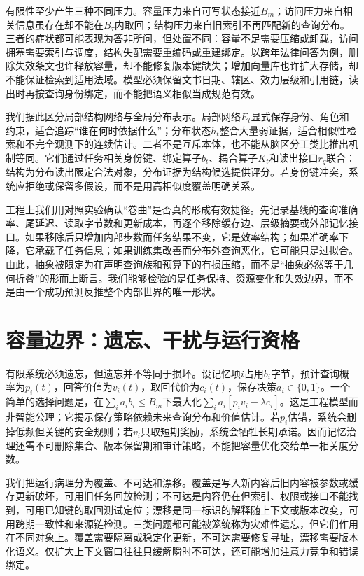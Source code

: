 有限性至少产生三种不同压力。容量压力来自可写状态接近$B_m$；访问压力来自相关信息虽存在却不能在$B_\tau$内取回；结构压力来自旧索引不再匹配新的查询分布。三者的症状都可能表现为答非所问，但处置不同：容量不足需要压缩或卸载，访问拥塞需要索引与调度，结构失配需要重编码或重建绑定。以跨年法律问答为例，删除失效条文也许释放容量，却不能修复版本键缺失；增加向量库也许扩大存储，却不能保证检索到适用法域。模型必须保留文书日期、辖区、效力层级和引用链，读出时再按查询身份绑定，而不能把语义相似当成规范有效。

我们据此区分局部结构网络与全局分布表示。局部网络$E_t$显式保存身份、角色和约束，适合追踪“谁在何时依据什么”；分布状态$h_t$整合大量弱证据，适合相似性检索和不完全观测下的连续估计。二者不是互斥本体，也不能从脑区分工类比推出机制等同。它们通过任务相关身份键、绑定算子$b_t$、耦合算子$K_t$和读出接口$r_q$联合：结构为分布读出限定合法对象，分布证据为结构候选提供评分。若身份键冲突，系统应拒绝或保留多假设，而不是用高相似度覆盖明确关系。

工程上我们用对照实验确认“卷曲”是否真的形成有效捷径。先记录基线的查询准确率、尾延迟、读取字节数和更新成本，再逐个移除缓存边、层级摘要或外部记忆接口。如果移除后只增加内部步数而任务结果不变，它是效率结构；如果准确率下降，它承载了任务信息；如果训练集改善而分布外查询恶化，它可能只是过拟合。由此，抽象被限定为在声明查询族和预算下的有损压缩，而不是“抽象必然等于几何折叠”的形而上断言。我们能够检验的是任务保持、资源变化和失效边界，而不是由一个成功预测反推整个内部世界的唯一形状。

\section{容量边界：遗忘、干扰与运行资格}
\label{sec:axiom_of_compactness_and_pathology}

有限系统必须遗忘，但遗忘并不等同于损坏。设记忆项$i$占用$b_i$字节，预计查询概率为$p_i(t)$，回答价值为$v_i(t)$，取回代价为$c_i(t)$，保存决策$a_i\in\{0,1\}$。一个简单的选择问题是，在$\sum_i a_i b_i\le B_m$下最大化$\sum_i a_i[p_i v_i-\lambda c_i]$。这是工程模型而非智能公理；它揭示保存策略依赖未来查询分布和价值估计。若$p_i$估错，系统会删掉低频但关键的安全规则；若$v_i$只取短期奖励，系统会牺牲长期承诺。因而记忆治理还需不可删除集合、版本保留期和审计策略，不能把容量优化交给单一相关度分数。

我们把运行病理分为覆盖、不可达和漂移。覆盖是写入新内容后旧内容被参数或缓存更新破坏，可用旧任务回放检测；不可达是内容仍在但索引、权限或接口不能找到，可用已知键的取回测试定位；漂移是同一标识的解释随上下文或版本改变，可用跨期一致性和来源链检测。三类问题都可能被笼统称为灾难性遗忘，但它们作用在不同对象上。覆盖需要隔离或稳定化更新，不可达需要修复寻址，漂移需要版本化语义。仅扩大上下文窗口往往只缓解瞬时不可达，还可能增加注意力竞争和错误绑定。

